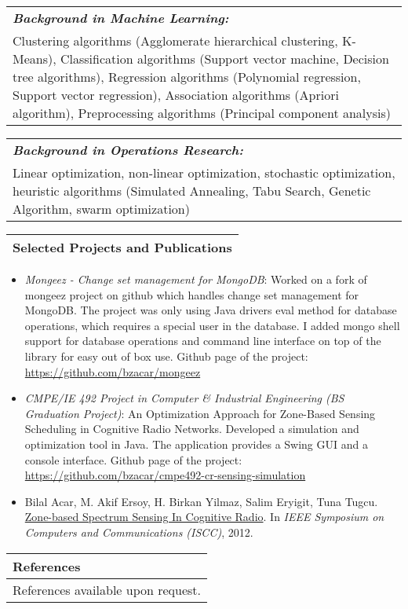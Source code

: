 \documentclass[11pt]{article}
\newcommand{\bigspace}{\vspace{0.4cm}}
\begin{document}
\bigspace

\begin{tabular}{p{18cm}}
\textit{\textbf{Background in Machine Learning:}}\\
Clustering algorithms (Agglomerate hierarchical clustering, K-Means), Classification algorithms (Support vector machine, Decision tree algorithms), Regression algorithms (Polynomial regression, Support vector regression), Association algorithms (Apriori algorithm), Preprocessing algorithms (Principal component analysis)
\end{tabular}


\begin{tabular}{p{18cm}}
\textit{\textbf{Background in Operations Research:}}\\
Linear optimization, non-linear optimization, stochastic optimization, heuristic algorithms (Simulated Annealing, Tabu Search, Genetic Algorithm, swarm optimization)
\end{tabular}

\pagebreak
\bigspace
\begin{tabular}{p{18cm}}
\textbf{Selected Projects and Publications} \\
\hline
\end{tabular}

\begin{itemize}
\item \textit{Mongeez - Change set management for MongoDB}: Worked on a fork of mongeez project on github which handles change set management for MongoDB. The project was only using Java drivers eval method for database operations, which requires a special user in the database. I added mongo shell support for database operations and command line interface on top of the library for easy out of box use. Github page of the project: \url{https://github.com/bzacar/mongeez}
\item \textit{CMPE/IE 492 Project in Computer \& Industrial Engineering (BS Graduation Project)}: An Optimization Approach for Zone-Based Sensing Scheduling in Cognitive Radio Networks. Developed a simulation and optimization tool in Java. The application provides a Swing GUI and a console interface. Github page of the project: \url{https://github.com/bzacar/cmpe492-cr-sensing-simulation}
\item Bilal Acar, M. Akif Ersoy, H. Birkan Yilmaz, Salim Eryigit, Tuna Tugcu. \href{http://www.computer.org/csdl/proceedings/iscc/2012/2712/00/IS273.pdf}{Zone-based Spectrum Sensing In Cognitive Radio}. In \textit{IEEE Symposium on Computers and Communications (ISCC)}, 2012.
\end{itemize}

\begin{tabular}{p{18cm}}
\textbf{References} \\
\hline
\vspace{0.2cm}
References available upon request.
\end{tabular}
\end{document}
